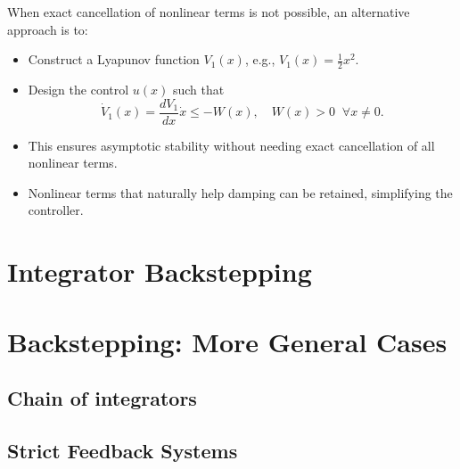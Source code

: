 \begin{remark}
When exact cancellation of nonlinear terms is not possible, an alternative approach is to:

\begin{itemize}
    \item Construct a Lyapunov function \(V_1(x)\), e.g., \(V_1(x) = \frac{1}{2} x^2\).  
    \item Design the control \(u(x)\) such that
    \[
    \dot{V}_1(x) = \frac{d V_1}{dx} \dot{x} \le - W(x), \quad W(x) > 0 \;\; \forall x \neq 0.
    \]  
    \item This ensures asymptotic stability without needing exact cancellation of all nonlinear terms.  
    \item Nonlinear terms that naturally help damping can be retained, simplifying the controller.
\end{itemize}
\end{remark}

\section{Integrator Backstepping}
\section{Backstepping: More General Cases}
\subsection{Chain of integrators}
\subsection{Strict Feedback Systems}